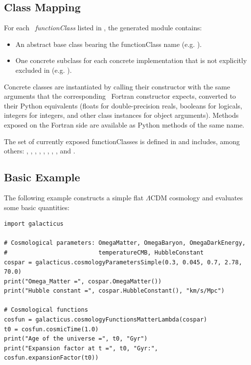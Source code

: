 \subsection{Class Mapping}\label{sec:pythonInterface:usage:classes}

For each \glc\ \emph{functionClass} listed in , the generated module contains:
\begin{itemize}
  \item An abstract base class bearing the functionClass name (e.g. ).
  \item One concrete subclass for each concrete implementation that is not explicitly excluded in  (e.g. ).
\end{itemize}
Concrete classes are instantiated by calling their constructor with the same arguments that the corresponding \glc\ Fortran constructor expects, converted to their Python equivalents (floats for double-precision reals, booleans for logicals, integers for integers, and other class instances for object arguments). Methods exposed on the Fortran side are available as Python methods of the same name.

The set of currently exposed functionClasses is defined in  and includes, among others: , , , , , , , , and .

\subsection{Basic Example}\label{sec:pythonInterface:usage:example}

The following example constructs a simple flat $\Lambda$CDM cosmology and evaluates some basic quantities:
\begin{verbatim}
import galacticus

# Cosmological parameters: OmegaMatter, OmegaBaryon, OmegaDarkEnergy,
#                          temperatureCMB, HubbleConstant
cospar = galacticus.cosmologyParametersSimple(0.3, 0.045, 0.7, 2.78, 70.0)
print("Omega_Matter =", cospar.OmegaMatter())
print("Hubble constant =", cospar.HubbleConstant(), "km/s/Mpc")

# Cosmological functions
cosfun = galacticus.cosmologyFunctionsMatterLambda(cospar)
t0 = cosfun.cosmicTime(1.0)
print("Age of the universe =", t0, "Gyr")
print("Expansion factor at t =", t0, "Gyr:", cosfun.expansionFactor(t0))
\end{verbatim}

